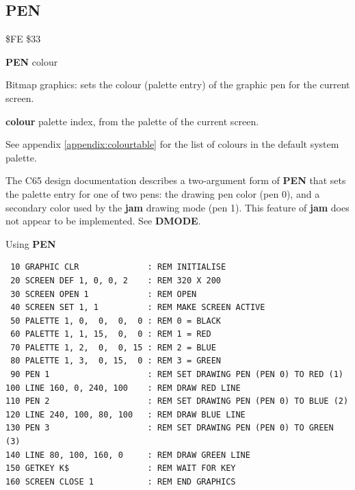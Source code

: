 \subsection{PEN}
\begin{description}[leftmargin=2cm,style=nextline]
\item [Token:]    \$FE \$33

\item [Format:]   {\bf PEN} colour

\item [Usage:]    Bitmap graphics: sets the colour (palette entry) of the graphic pen for the current screen.

                  {\bf colour} palette index, from the palette of the current screen.

                  See appendix \vref{appendix:colourtable} for the list of colours in the default system palette.

\item [Remarks:]  The C65 design documentation describes a two-argument form of {\bf PEN} that sets the palette entry for one of two pens: the drawing pen color (pen 0), and a secondary color used by the {\bf jam} drawing mode (pen 1). This feature of {\bf jam} does not appear to be implemented. See {\bf DMODE}.

\item [Example:]  Using {\bf PEN}

\begin{tcolorbox}[colback=black,coltext=white]
\verbatimfont{\codefont}
\begin{verbatim}
 10 GRAPHIC CLR              : REM INITIALISE
 20 SCREEN DEF 1, 0, 0, 2    : REM 320 X 200
 30 SCREEN OPEN 1            : REM OPEN
 40 SCREEN SET 1, 1          : REM MAKE SCREEN ACTIVE
 50 PALETTE 1, 0,  0,  0,  0 : REM 0 = BLACK
 60 PALETTE 1, 1, 15,  0,  0 : REM 1 = RED
 70 PALETTE 1, 2,  0,  0, 15 : REM 2 = BLUE
 80 PALETTE 1, 3,  0, 15,  0 : REM 3 = GREEN
 90 PEN 1                    : REM SET DRAWING PEN (PEN 0) TO RED (1)
100 LINE 160, 0, 240, 100    : REM DRAW RED LINE
110 PEN 2                    : REM SET DRAWING PEN (PEN 0) TO BLUE (2)
120 LINE 240, 100, 80, 100   : REM DRAW BLUE LINE
130 PEN 3                    : REM SET DRAWING PEN (PEN 0) TO GREEN (3)
140 LINE 80, 100, 160, 0     : REM DRAW GREEN LINE
150 GETKEY K$                : REM WAIT FOR KEY
160 SCREEN CLOSE 1           : REM END GRAPHICS
\end{verbatim}
\end{tcolorbox}
\end{description}


